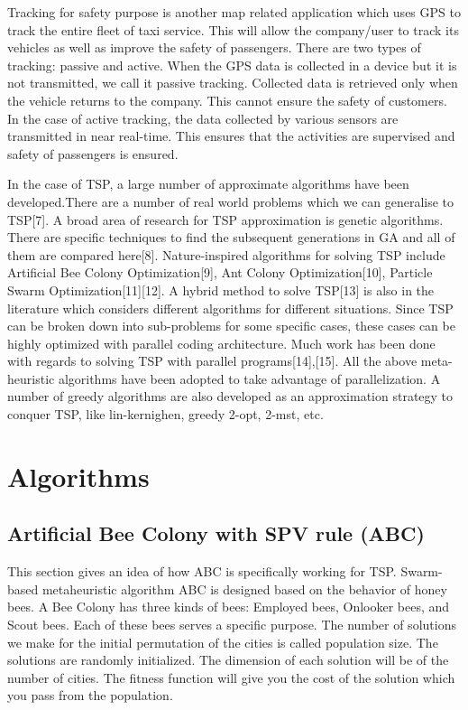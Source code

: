 \documentclass[conference]{IEEEtran}
\begin{document}
Tracking for safety purpose is another map related application which uses GPS to track the entire fleet of taxi service. This will allow the company/user to track its vehicles as well as improve the safety of passengers. There are two types of tracking: passive and active. When the GPS data is collected in a device but it is not transmitted, we call it passive tracking. Collected data is retrieved only when the vehicle returns to the company. This cannot ensure the safety of customers. In the case of active tracking, the data collected by various sensors are transmitted in near real-time. This ensures that the activities are supervised and safety of passengers is ensured.  

In the case of TSP, a large number of approximate algorithms have been developed.There are a number of real world problems which we can generalise to TSP[7]. A broad area of research for TSP approximation is genetic algorithms. There are specific techniques to find the subsequent generations in GA and all of them are compared here[8]. Nature-inspired algorithms for solving TSP include Artificial Bee Colony Optimization[9], Ant Colony Optimization[10], Particle Swarm Optimization[11][12]. A hybrid method to solve TSP[13] is also in the literature which considers different algorithms for different situations. Since TSP can be broken down into sub-problems for some specific cases, these cases can be highly optimized with parallel coding architecture. Much work has been done with regards to solving TSP with parallel programs[14],[15]. All the above meta-heuristic algorithms have been adopted to take advantage of parallelization. A number of greedy algorithms are also developed as an approximation strategy to conquer TSP, like lin-kernighen, greedy 2-opt, 2-mst, etc. 


\section{Algorithms}
\subsection {Artificial Bee Colony with SPV rule (ABC)}
This section gives an idea of how ABC is specifically working for TSP. Swarm-based metaheuristic algorithm ABC is designed based on the behavior of honey bees. A Bee Colony has three kinds of bees: Employed bees, Onlooker bees, and Scout bees. Each of these bees serves a specific purpose. The number of solutions we make for the initial permutation of the cities is called population size. The solutions are randomly initialized. The dimension of each solution will be of the number of cities. The fitness function will give you the cost of the solution which you pass from the population. 
\end{document}
